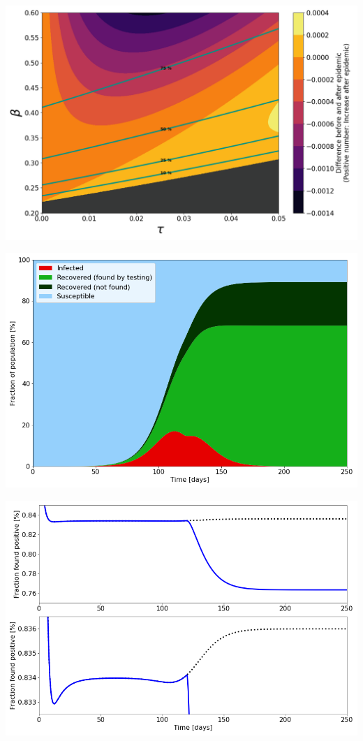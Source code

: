 \documentclass[10pt,a4paper,landscape]{article}
\begin{document}
\includegraphics[width=0.98\linewidth]{TestIntensity_RatioDifferenceLines_Zoom.png}

\includegraphics[width=0.98\linewidth]{TestIntensity_ExampleStackedChange.png}

\includegraphics[width=0.98\linewidth]{TestIntensity_ExampleChangeRatio.png}
\end{document}

